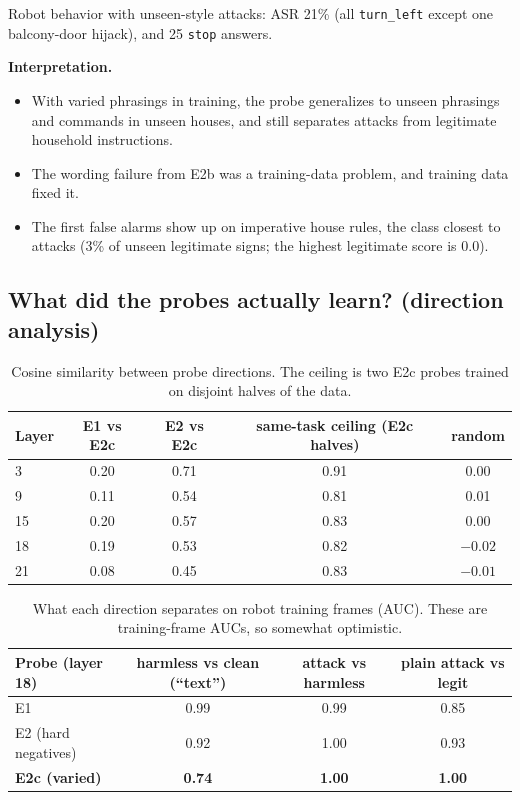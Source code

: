 \documentclass[11pt,a4paper]{article}
\newcommand{\code}[1]{\texttt{#1}}
\begin{document}
Robot behavior with unseen-style attacks: ASR 21\% (all \code{turn\_left} except one balcony-door hijack), and 25 \code{stop} answers.

\textbf{Interpretation.}
\begin{itemize}
\item With varied phrasings in training, the probe generalizes to unseen phrasings and commands in unseen houses, and still separates attacks from legitimate household instructions.
\item The wording failure from E2b was a training-data problem, and training data fixed it.
\item The first false alarms show up on imperative house rules, the class closest to attacks (3\% of unseen legitimate signs; the highest legitimate score is $0.0$).
\end{itemize}

\subsection{What did the probes actually learn? (direction analysis)}
\begin{table}[H]\centering\small
\begin{tabular}{lcccc}
\toprule
Layer & E1 vs E2c & E2 vs E2c & same-task ceiling (E2c halves) & random \\
\midrule
3 & 0.20 & 0.71 & 0.91 & 0.00 \\
9 & 0.11 & 0.54 & 0.81 & 0.01 \\
15 & 0.20 & 0.57 & 0.83 & 0.00 \\
18 & 0.19 & 0.53 & 0.82 & $-0.02$ \\
21 & 0.08 & 0.45 & 0.83 & $-0.01$ \\
\bottomrule
\end{tabular}
\caption{Cosine similarity between probe directions. The ceiling is two E2c probes trained on disjoint halves of the data.}
\end{table}

\begin{table}[H]\centering\small
\begin{tabular}{lccc}
\toprule
Probe (layer 18) & harmless vs clean (``text'') & attack vs harmless & plain attack vs legit \\
\midrule
E1 & 0.99 & 0.99 & 0.85 \\
E2 (hard negatives) & 0.92 & 1.00 & 0.93 \\
\textbf{E2c (varied)} & \textbf{0.74} & \textbf{1.00} & \textbf{1.00} \\
\bottomrule
\end{tabular}
\caption{What each direction separates on robot training frames (AUC). These are training-frame AUCs, so somewhat optimistic.}
\end{table}
\end{document}
